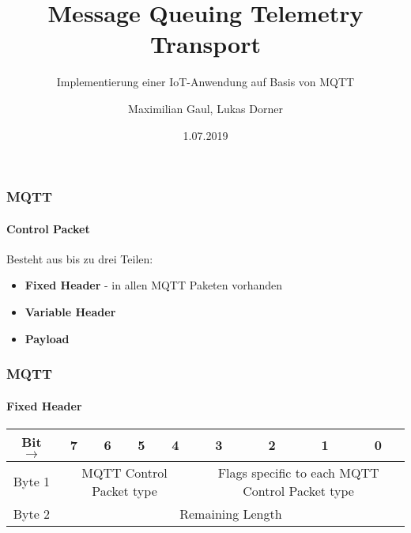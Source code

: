 \documentclass{beamer}
\title{Message Queuing Telemetry Transport}
\subtitle{Implementierung einer IoT-Anwendung auf Basis von MQTT}
\author{Maximilian Gaul, Lukas Dorner}
\date{1.07.2019}
\begin{document}
	
\begin{frame}
	\titlepage
\end{frame}

\begin{frame}
\frametitle{MQTT}
\framesubtitle{Control Packet}
Besteht aus bis zu drei Teilen:
\begin{itemize}
	\item \textbf{Fixed Header} - in allen MQTT Paketen vorhanden
	\item \textbf{Variable Header}
	\item \textbf{Payload}
\end{itemize}

\end{frame}

\begin{frame}
\frametitle{MQTT}
\framesubtitle{Fixed Header}
\begin{tabular}{c|c|c|c|c|c|c|c|c}
	\hline
	\textbf{Bit $\rightarrow$} & 7 & 6 & 5 & 4 & 3 & 2 & 1 & 0\\
	\hline
	Byte 1 & \multicolumn{4}{|c|}{MQTT Control Packet type} & \multicolumn{4}{c}{Flags specific to each MQTT Control Packet type}\\
	\hline
	Byte 2 & \multicolumn{8}{c}{Remaining Length}\\
	\hline
\end{tabular}

\end{frame}
\end{document}
